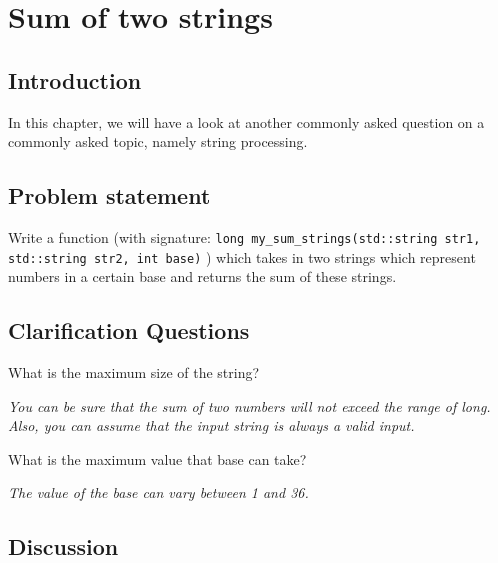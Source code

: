 %


\chapter{Sum of two strings}
\label{ch:sum_two_strings}
\section*{Introduction}

In this chapter, we will have a look at another commonly asked question on a commonly asked topic, namely string processing.

\section{Problem statement}

Write a function (with signature: \lstinline[columns=fixed]{long my_sum_strings(std::string str1, std::string str2, int base)} ) which takes in two strings which represent numbers in a certain base and returns the sum of these strings.


\section{Clarification Questions}
\begin{QandA}

\item What is the maximum size of the string?
	\begin{answered}
		\textit{You can be sure that the sum of two numbers will not exceed the range of long. Also, you can assume that the input string is always a valid input.}
	\end{answered}

\item What is the maximum value that base can take?
	\begin{answered}
		\textit{The value of the base can vary between 1 and 36.}
	\end{answered}

\end{QandA}

\section{Discussion}

